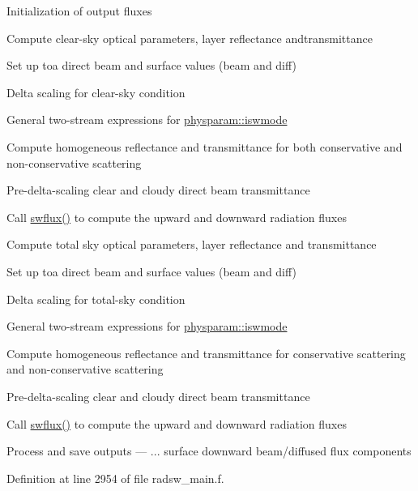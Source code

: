 \begin{DoxyEnumerate}
\item Initialization of output fluxes
\item Compute clear-\/sky optical parameters, layer reflectance andtransmittance
\begin{DoxyItemize}
\item Set up toa direct beam and surface values (beam and diff)
\item Delta scaling for clear-\/sky condition
\item General two-\/stream expressions for \hyperlink{namespacephysparam_afe7d9a3a1e3cd4711675252a0921853b}{physparam\+::iswmode}
\item Compute homogeneous reflectance and transmittance for both conservative and non-\/conservative scattering
\item Pre-\/delta-\/scaling clear and cloudy direct beam transmittance
\item Call \hyperlink{namespacemodule__radsw__main_a138ee8c91089737c432cf70dbd8a8fae}{swflux()} to compute the upward and downward radiation fluxes
\end{DoxyItemize}
\item Compute total sky optical parameters, layer reflectance and transmittance
\begin{DoxyItemize}
\item Set up toa direct beam and surface values (beam and diff)
\item Delta scaling for total-\/sky condition
\item General two-\/stream expressions for \hyperlink{namespacephysparam_afe7d9a3a1e3cd4711675252a0921853b}{physparam\+::iswmode}
\item Compute homogeneous reflectance and transmittance for conservative scattering and non-\/conservative scattering
\item Pre-\/delta-\/scaling clear and cloudy direct beam transmittance
\item Call \hyperlink{namespacemodule__radsw__main_a138ee8c91089737c432cf70dbd8a8fae}{swflux()} to compute the upward and downward radiation fluxes
\end{DoxyItemize}
\item Process and save outputs --- ... surface downward beam/diffused flux components 
\end{DoxyEnumerate}

Definition at line 2954 of file radsw\+\_\+main.\+f.



